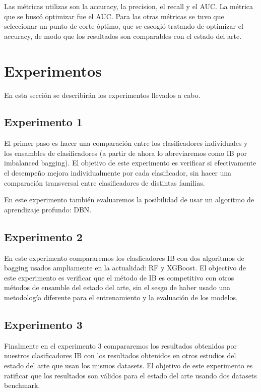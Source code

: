 Las métricas utilizas son la accuracy, la precision, el recall y el AUC. La métrica que se buscó optimizar fue el AUC. Para las otras métricas se tuvo que seleccionar un punto de corte óptimo, que se escogió tratando de optimizar el accuracy, de modo que los resultados son comparables con el estado del arte.

\section{Experimentos}

En esta sección se describirán los experimentos llevados a cabo.

\subsection{Experimento 1}

El primer paso es hacer una comparación entre los clasificadores individuales y los ensambles de clasificadores (a partir de ahora lo abreviaremos como IB por imbalanced bagging). El objetivo de este experimento es verificar si efectivamente el desempeño mejora individualmente por cada clasificador, sin hacer una comparación transversal entre clasificadores de distintas familias.

En este experimento también evaluaremos la posibilidad de usar un algoritmo de aprendizaje profundo: \ac{DBN}.

\subsection{Experimento 2}

En este experimento compararemos los clasficadores IB con dos algoritmos de bagging usados ampliamente en la actualidad: \ac{RF} y \ac{XGBoost}. El objectivo de este experimento es verificar que el método de IB es competitivo con otros métodos de ensamble del estado del arte, sin el sesgo de haber usado una metodología diferente para el entrenamiento y la evaluación de los modelos.

\subsection{Experimento 3}

Finalmente en el experimento 3 compararemos los resultados obtenidos por nuestros clasificadores IB con los resultados obtenidos en otros estudios del estado del arte que usan los mismos datasets. El objetivo de este experimento es ratificar que los resultados son válidos para el estado del arte usando dos datasets benchmark.
